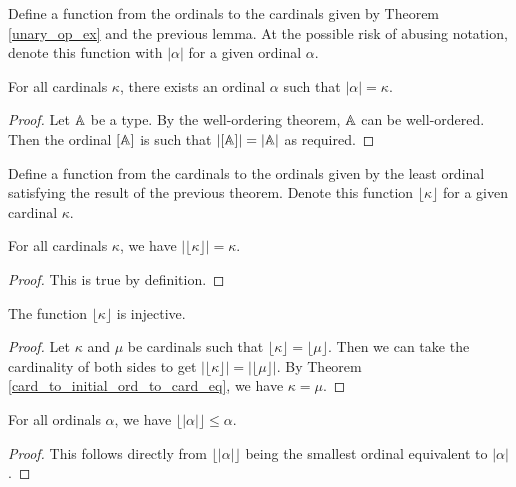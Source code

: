 \documentclass[../../math.tex]{subfiles}
\begin{document}
\begin{definition}
    Define a function from the ordinals to the cardinals given by Theorem
    \ref{unary_op_ex} and the previous lemma.  At the possible risk of abusing
    notation, denote this function with $|\alpha|$ for a given ordinal $\alpha$.
\end{definition}

\begin{lemma}
    For all cardinals $\kappa$, there exists an ordinal $\alpha$ such that
    $|\alpha| = \kappa$.
\end{lemma}
\begin{proof}
    Let $\mathbb{A}$ be a type.  By the well-ordering theorem, $\mathbb{A}$ can be well-ordered.
    Then the ordinal $[\mathbb{A}]$ is such that $|[\mathbb{A}]| = |\mathbb{A}|$ as required.
\end{proof}

\begin{definition}
    Define a function from the cardinals to the ordinals given by the least
    ordinal satisfying the result of the previous theorem.  Denote this function
    $\lfloor \kappa \rfloor$ for a given cardinal $\kappa$.
\end{definition}

\begin{theorem} \label{card_to_initial_ord_to_card_eq}
    For all cardinals $\kappa$, we have $|\lfloor \kappa \rfloor| = \kappa$.
\end{theorem}
\begin{proof}
    This is true by definition.
\end{proof}

\begin{instance}
    The function $\lfloor \kappa \rfloor$ is injective.
\end{instance}
\begin{proof}
    Let $\kappa$ and $\mu$ be cardinals such that $\lfloor \kappa \rfloor =
    \lfloor \mu \rfloor$.  Then we can take the cardinality of both sides to get
    $|\lfloor \kappa \rfloor| = |\lfloor \mu \rfloor|$.  By Theorem
    \ref{card_to_initial_ord_to_card_eq}, we have $\kappa = \mu$.
\end{proof}

\begin{theorem} \label{ord_to_card_to_initial_ord_le}
    For all ordinals $\alpha$, we have $\lfloor|\alpha|\rfloor \leq \alpha$.
\end{theorem}
\begin{proof}
    This follows directly from $\lfloor|\alpha|\rfloor$ being the smallest
    ordinal equivalent to $|\alpha|$.
\end{proof}
\end{document}
